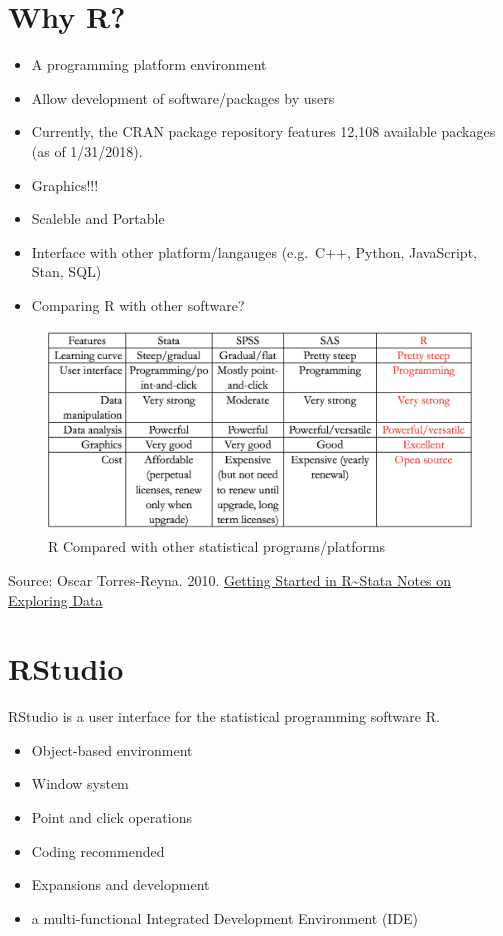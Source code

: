 \documentclass[]{book}
\providecommand{\tightlist}{%
  \setlength{\itemsep}{0pt}\setlength{\parskip}{0pt}}
\begin{document}
\hypertarget{why-r}{%
\section{Why R?}\label{why-r}}

\begin{itemize}
\tightlist
\item
  A programming platform environment
\item
  Allow development of software/packages by users
\item
  Currently, the CRAN package repository features 12,108 available packages (as of 1/31/2018).
\item
  Graphics!!!
\item
  Scaleble and Portable
\item
  Interface with other platform/langauges (e.g.~C++, Python, JavaScript, Stan, SQL)
\item
  Comparing R with other software?
\end{itemize}

\begin{figure}
\includegraphics[width=1\linewidth]{Rcompare} \caption{R Compared with other statistical programs/platforms}\label{fig:Rcompare}
\end{figure}

Source: Oscar Torres-Reyna. 2010. \href{https://dss.princeton.edu/training/RStata.pdf}{Getting Started in R\textasciitilde Stata Notes on Exploring Data}

\hypertarget{rstudio}{%
\section{RStudio}\label{rstudio}}

RStudio is a user interface for the statistical programming software R.

\begin{itemize}
\tightlist
\item
  Object-based environment
\item
  Window system
\item
  Point and click operations
\item
  Coding recommended\\
\item
  Expansions and development
\item
  a multi-functional Integrated Development Environment (IDE)
\end{itemize}
\end{document}
